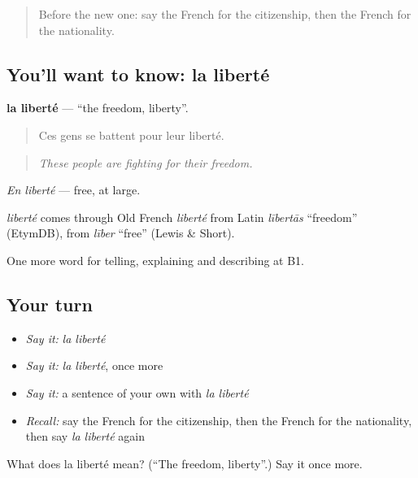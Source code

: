 \begin{quote}
Before the new one: say the French for the citizenship, then the French for the nationality.
\end{quote}

\subsection*{You'll want to know: la liberté}
\textbf{la liberté} — \textquotedblleft{}the freedom, liberty\textquotedblright{}.

\begin{quote}
Ces gens se battent pour leur liberté.
\end{quote}

\begin{quote}
\emph{These people are fighting for their freedom.}
\end{quote}

\emph{En liberté} — free, at large.

\begin{cousinweb}
\emph{liberté} comes through Old French \emph{liberté} from Latin \emph{lībertās} \textquotedblleft{}freedom\textquotedblright{} (EtymDB), from \emph{līber} \textquotedblleft{}free\textquotedblright{} (Lewis \& Short).
\end{cousinweb}

\begin{grammarlens}[title={What you've built}]
One more word for telling, explaining and describing at B1.
\end{grammarlens}

\subsection*{Your turn}
\begin{itemize}
\raggedright
  \item \emph{Say it:} \emph{la liberté}
  \item \emph{Say it:} \emph{la liberté}, once more
  \item \emph{Say it:} a sentence of your own with \emph{la liberté}
  \item \emph{Recall:} say the French for the citizenship, then the French for the nationality, then say \emph{la liberté} again
\end{itemize}

\begin{tcolorbox}[breakable,colback=teal!4,colframe=teal!35!black,title={Before you move on}]
What does la liberté mean? (\textquotedblleft{}The freedom, liberty\textquotedblright{}.) Say it once more.
\end{tcolorbox}
